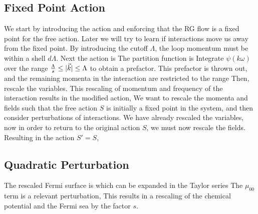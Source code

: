 \documentclass{article}
\begin{document}
\subsection{Fixed Point Action}
We start by introducing the action and enforcing that the RG flow is a fixed point for the free action. Later we will try to learn if interactions move us away from the fixed point.
By introducing the cutoff $\Lambda$, the loop momentum must be within a shell $d\Lambda$. Next the action is
The partition function is
Integrate $\psi(k\omega)$ over the range $\frac{\Lambda}{s}\leq |\vec{k}| \leq \Lambda$ to obtain a prefactor. This prefactor is thrown out, and the remaining momenta in the interaction are restricted to the range
Then, rescale the variables.
This rescaling of momentum and frequency of the interaction results in the modified action,
We want to rescale the momenta and fields such that the free action $S$ is initially a fixed point in the system, and then consider perturbations of interactions. We have already rescaled the variables, now in order to return to the original action $S$, we must now rescale the fields.
Resulting in the action $S'=S$,
\subsection{Quadratic Perturbation}
The rescaled Fermi surface is
which can be expanded in the Taylor series
The $\mu_{00}$ term is a relevant perturbation,
This results in a rescaling of the chemical potential and the Fermi sea by the factor $s$.
\end{document}
